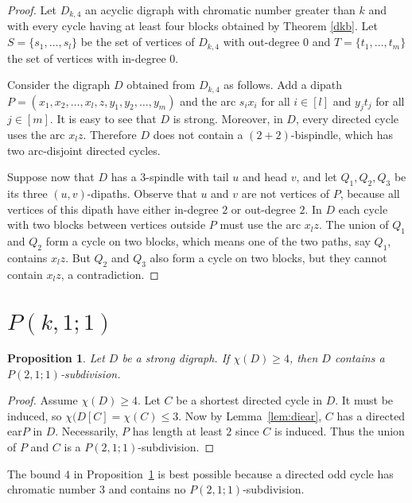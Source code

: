 \documentclass[utf8,10pt]{article}
\theoremstyle{plain}
\newtheorem{proposition}[theorem]{Proposition}
\theoremstyle{definition}
\theoremstyle{remark}
\begin{document}
\begin{proof}
Let $D_{k,4}$ an acyclic digraph with chromatic number greater than $k$ and with every cycle having at least four blocks obtained by Theorem \ref{dkb}.
Let $S = \{s_1, \dots,  s_l\}$ be the set of vertices of $D_{k,4}$ with out-degree 0 and $T = \{t_1, \dots, t_m\}$ the set of vertices with in-degree 0.

Consider the digraph $D$ obtained from $D_{k,4}$ as follows. Add a dipath  $P = (x_1,x_2, \dots , x_l,z,y_1,y_2,\dots, y_m)$ and the arc $s_ix_i$ for all $i\in [l]$ and
$y_jt_j$ for all $j\in [m]$. It is easy to see that $D$ is strong.
Moreover, in $D$, every directed cycle uses the arc $x_lz$. Therefore $D$ does not contain a $(2+2)$-bispindle, which has two arc-disjoint directed cycles. 

Suppose now that $D$ has a $3$-spindle with tail $u$ and head $v$, and let $Q_1, Q_2, Q_3$ be its three $(u,v)$-dipaths. Observe that $u$ and $v$ are not vertices of $P$, because all vertices of this dipath have either in-degree $2$ or out-degree $2$. In $D$ each cycle with two blocks between vertices outside $P$ must use the arc $x_lz$. The union of $Q_1$ and $Q_2$ form a cycle on two blocks, 
which means one of the two paths, say $Q_1$, contains $x_lz$. But $Q_2$ and $Q_3$ also form a cycle on two blocks, but they cannot contain $x_lz$, a contradiction.
\end{proof}




\section{$P(k,1;1)$}\label{sec:k,1,1}



\begin{proposition}\label{prop:p211}
Let $D$ be a strong digraph.
If $\chi(D)\geq 4$, then $D$ contains a $P(2,1;1)$-subdivision.
\end{proposition}
\begin{proof}
Assume  $\chi(D)\geq 4$.
Let $C$ be a shortest directed cycle in $D$. 
It must be induced, so $\chi(D[C]=\chi(C) \leq 3$. 
Now by Lemma~\ref{lem:diear}, $C$ has a directed ear$P$ in $D$. Necessarily, $P$ has length at least $2$ since $C$ is induced.
Thus the union of $P$ and $C$ is a $P(2,1;1)$-subdivision.
\end{proof}

The bound $4$ in Proposition~\ref{prop:p211} is best possible because a directed odd cycle has chromatic number $3$ and contains no $P(2,1;1)$-subdivision.
\end{document}
